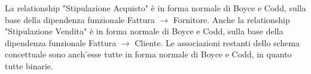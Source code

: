 
La relationship "Stipulazione Acquisto" è in forma normale di Boyce e Codd, sulla base della dipendenza funzionale Fattura $\rightarrow$ Fornitore.
\newline
Anche la relationship "Stipulazione Vendita" è in forma normale di Boyce e Codd, sulla base della dipendenza funzionale Fattura $\rightarrow$ Cliente.
\newline\newline
Le associazioni restanti dello schema concettuale sono anch'esse tutte in forma normale di Boyce e Codd, in quanto tutte binarie.

\noindent{}
